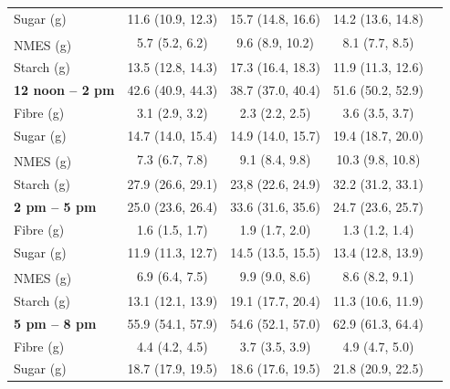 \begin{table}[H]
\begin{tabular}[t]{lcccc}
		\hspace{2em}Sugar (g) & 11.6 (10.9, 12.3) & 15.7 (14.8, 16.6) & 14.2 (13.6, 14.8) & \\
		\hspace{3em}NMES (g)\textsuperscript{\dag} & 5.7 (5.2, 6.2) & 9.6 (8.9, 10.2) & 8.1 (7.7, 8.5) & \\
		\hspace{2em}Starch (g) & 13.5 (12.8, 14.3) & 17.3 (16.4, 18.3) & 11.9 (11.3, 12.6) & \\
		\hspace{1em}\textbf{12 noon – 2 pm} & 42.6 (40.9, 44.3) & 38.7 (37.0, 40.4) & 51.6 (50.2, 52.9) & \\
		\hspace{2em}Fibre (g) & 3.1 (2.9, 3.2) & 2.3 (2.2, 2.5) & 3.6 (3.5, 3.7) & \\
		\hspace{2em}Sugar (g) & 14.7 (14.0, 15.4) & 14.9 (14.0, 15.7) & 19.4 (18.7, 20.0) & \\
		\hspace{3em}NMES (g)\textsuperscript{\dag} & 7.3 (6.7, 7.8) & 9.1 (8.4, 9.8) & 10.3 (9.8, 10.8) & \\
		\hspace{2em}Starch (g) & 27.9 (26.6, 29.1) & 23,8 (22.6, 24.9) & 32.2 (31.2, 33.1) & \\
		\hspace{1em}\textbf{2 pm – 5 pm} & 25.0 (23.6, 26.4) & 33.6 (31.6, 35.6) & 24.7 (23.6, 25.7) & \\
		\hspace{2em}Fibre (g) & 1.6 (1.5, 1.7) & 1.9 (1.7, 2.0) & 1.3 (1.2, 1.4) & \\
		\hspace{2em}Sugar (g) & 11.9 (11.3, 12.7) & 14.5 (13.5, 15.5) & 13.4 (12.8, 13.9) & \\
		\hspace{3em}NMES (g)\textsuperscript{\dag} & 6.9 (6.4, 7.5) & 9.9 (9.0, 8.6) & 8.6 (8.2, 9.1) & \\
		\hspace{2em}Starch (g) & 13.1 (12.1, 13.9) & 19.1 (17.7, 20.4) & 11.3 (10.6, 11.9) & \\
		\hspace{1em}\textbf{5 pm – 8 pm} & 55.9 (54.1, 57.9) & 54.6 (52.1, 57.0) & 62.9 (61.3, 64.4) & \\
		\hspace{2em}Fibre (g) & 4.4 (4.2, 4.5) & 3.7 (3.5, 3.9) & 4.9 (4.7, 5.0) & \\
		\hspace{2em}Sugar (g) & 18.7 (17.9, 19.5) & 18.6 (17.6, 19.5) & 21.8 (20.9, 22.5) & \\

\end{tabular}
\end{table}
